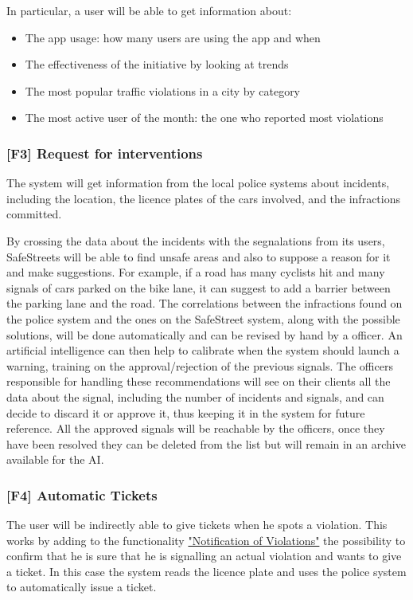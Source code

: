 In particular, a user will be able to get information about:
\begin{itemize}
    \item The app usage: how many users are using the app and when
    \item The effectiveness of the initiative by looking at trends
    \item The most popular traffic violations in a city by category
    \item The most active user of the month: the one who reported most violations
\end{itemize}
\subsubsection[Request for interventions]{[F3] Request for interventions\hypertarget{sec:f3}{}}
\label{sec:request_for_interventions}
The system will get information from the local police systems about incidents, including the location, the licence plates of the cars involved, and the infractions committed.

By crossing the data about the incidents with the segnalations from its users, SafeStreets will be able to find unsafe areas and also to suppose a reason for it and make suggestions.
For example, if a road has many cyclists hit and many signals of cars parked on the bike lane, it can suggest to add a barrier between the parking lane and the road.
The correlations between the infractions found on the police system and the ones on the SafeStreet system, along with the possible solutions, will be done automatically and can be revised by hand by a officer.
An artificial intelligence can then help to calibrate when the system should launch a warning, training on the approval/rejection of the previous signals.
The officers responsible for handling these recommendations will see on their clients all the data about the signal,
including the number of incidents and signals, and can decide to discard it or approve it, thus keeping it in the system for future reference.
All the approved signals will be reachable by the officers, once they have been resolved they can be deleted from the list but will remain in an archive available for the AI.


\subsubsection[Automatic Tickets]{[F4] Automatic Tickets\hypertarget{sec:f4}{}}
\label{sec:automatic_tickets}
The user will be indirectly able to give tickets when he spots a violation. This works by adding to the functionality
\hyperref[sec:notification_of_violations]{"Notification of Violations"}
the possibility to confirm that he is sure that he is signalling an actual violation and wants to give a ticket.
In this case the system reads the licence plate and uses the police system to automatically issue a ticket.

